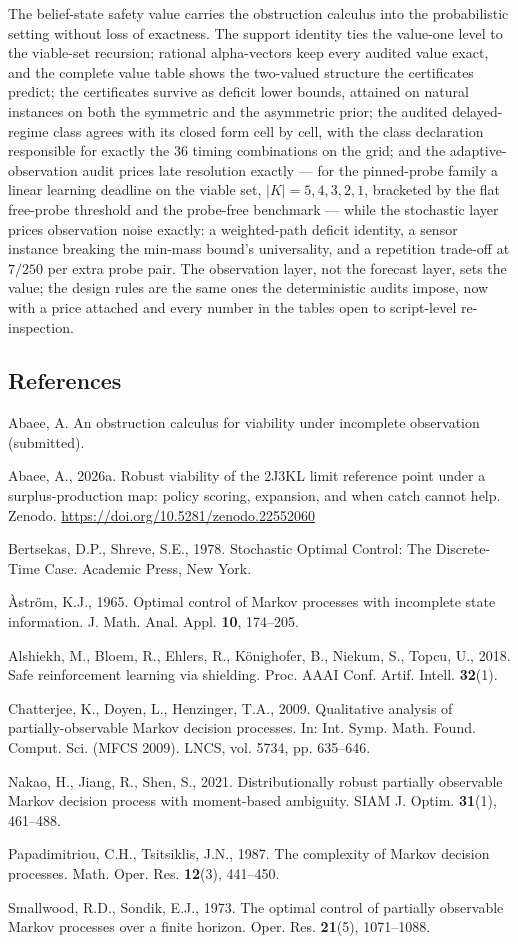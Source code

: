 \documentclass[10pt,twocolumn]{article}
\theoremstyle{plain}
\theoremstyle{definition}
\theoremstyle{remark}
\begin{document}
The belief-state safety value carries the obstruction calculus into the
probabilistic setting without loss of exactness. The support identity
ties the value-one level to the viable-set recursion; rational
alpha-vectors keep every audited value exact, and the complete value
table shows the two-valued structure the certificates predict; the
certificates survive as deficit lower bounds, attained on natural
instances on both the symmetric and the asymmetric prior; the audited
delayed-regime class agrees with its closed form cell by cell, with the class declaration responsible for exactly the 36 timing
combinations on the grid; and the adaptive-observation audit prices late resolution exactly ---
for the pinned-probe family a linear learning deadline on the viable
set, \(|K| = 5, 4, 3, 2, 1\), bracketed by the flat free-probe
threshold and the probe-free benchmark --- while the stochastic layer
prices observation noise exactly: a weighted-path deficit identity, a
sensor instance breaking the min-mass bound's universality, and a
repetition trade-off at \(7/250\) per extra probe pair. The
observation layer, not the forecast layer, sets the value; the design
rules are the same ones the deterministic audits impose, now with a
price attached and every number in the tables open to script-level
re-inspection.

\subsection*{References}

{\footnotesize
Abaee, A. An obstruction calculus for viability under incomplete
observation (submitted).

Abaee, A., 2026a. Robust viability of the 2J3KL limit reference point
under a surplus-production map: policy scoring, expansion, and when
catch cannot help. Zenodo.
\url{https://doi.org/10.5281/zenodo.22552060}

Bertsekas, D.P., Shreve, S.E., 1978. Stochastic Optimal Control: The
Discrete-Time Case. Academic Press, New York.

\`{A}str\"{o}m, K.J., 1965. Optimal control of Markov processes with
incomplete state information. J. Math. Anal. Appl. \textbf{10},
174--205.

Alshiekh, M., Bloem, R., Ehlers, R., K\"{o}nighofer, B., Niekum, S.,
Topcu, U., 2018. Safe reinforcement learning via shielding. Proc. AAAI
Conf. Artif. Intell. \textbf{32}(1).

Chatterjee, K., Doyen, L., Henzinger, T.A., 2009. Qualitative analysis
of partially-observable Markov decision processes. In: Int. Symp. Math.
Found. Comput. Sci. (MFCS 2009). LNCS, vol. 5734, pp. 635--646.

Nakao, H., Jiang, R., Shen, S., 2021. Distributionally robust partially
observable Markov decision process with moment-based ambiguity. SIAM J.
Optim. \textbf{31}(1), 461--488.

Papadimitriou, C.H., Tsitsiklis, J.N., 1987. The complexity of Markov
decision processes. Math. Oper. Res. \textbf{12}(3), 441--450.

Smallwood, R.D., Sondik, E.J., 1973. The optimal control of partially
observable Markov processes over a finite horizon. Oper. Res.
\textbf{21}(5), 1071--1088.
}
\end{document}
